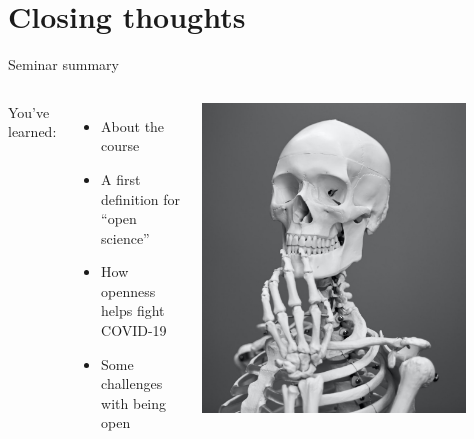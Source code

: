 \section[Closing]{Closing thoughts}
\label{sec:closing}

\begin{frame}{Seminar summary}

	\begin{columns}
		You've learned:
		\begin{itemize}
			\item About the course
			\item A first definition for ``open science''
			\item How openness helps fight COVID-19
			\item Some challenges with being open
		\end{itemize}

		
		    \includegraphics[width=0.85\textwidth]{images/mathew-schwartz-8rj4sz9YLCI-unsplash-crop.jpg}
		    
		
	\end{columns}

\end{frame}

